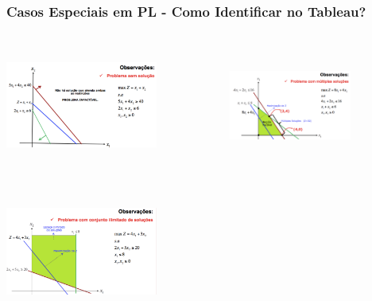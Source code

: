 \documentclass{beamer}
\begin{document}
\begin{frame}
	\frametitle{Casos Especiais em PL - Como Identificar no Tableau?}
	\centering
	\begin{columns}
		\begin{column}{5cm}
			\centering
			\includegraphics[width=5cm,height=4cm]{prob_semsol.png}
		\end{column}
		\begin{column}{5cm}
			\centering
			\includegraphics[width=4cm,height=4cm]{prob_multsol.png}
		\end{column}
	\end{columns}
	\includegraphics[width=5cm,height=4cm]{prob_ilimitado.png}
\end{frame}
\end{document}
